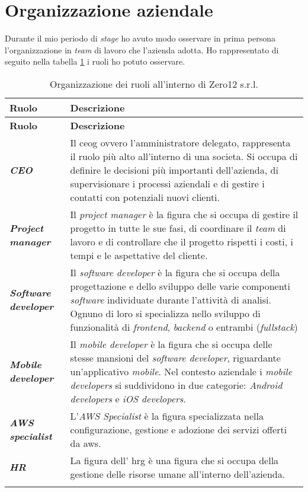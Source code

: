\section{Organizzazione aziendale}
Durante il mio periodo di \textit{stage} ho avuto modo osservare in prima persona l'organizzazione in \textit{team} di lavoro che l'azienda adotta.
Ho rappresentato di seguito nella tabella \ref{tab:ruoli} i ruoli ho potuto osservare.
\begin{longtable}{|p{3.5cm}|p{8cm}|}
    \hline
    \rowcolor{tableheader}\textbf{Ruolo} & \textbf{Descrizione} \\
    \hline
    \endfirsthead

    \rowcolor{tableheader}\textbf{Ruolo} & \textbf{Descrizione} \\
    \hline
    \endhead

    \hline
    \endfoot

    \hline
    \endlastfoot
    \hline
    \rowcolor{tableoddrow}\textbf{\textit{CEO}} & Il \gls{ceog} ovvero l'amministratore delegato, rappresenta il ruolo più alto all'interno di una societa. Si occupa di definire le decisioni più importanti dell'azienda, di supervisionare i processi aziendali e di gestire i contatti con potenziali nuovi clienti. \\
    \hline
    \rowcolor{tableevenrow}\textbf{\textit{Project manager}} & Il \textit{project manager} è la figura che si occupa di gestire il progetto in tutte le sue fasi, di coordinare il \textit{team} di lavoro e di controllare che il progetto rispetti i costi, i tempi e le aspettative del cliente.\\
    \hline
    \rowcolor{tableoddrow}\textbf{\textit{Software developer}} & Il \textit{software developer} è la figura che si occupa della progettazione e dello sviluppo delle varie componenti \textit{software} individuate durante l'attività di analisi. Ognuno di loro si specializza nello sviluppo di funzionalità di \textit{frontend}, \textit{backend} o entrambi (\textit{fullstack})\\
    \hline
    \rowcolor{tableevenrow}\textbf{\textit{Mobile developer}} & Il \textit{mobile developer} è la figura che si occupa delle stesse mansioni del \textit{software developer}, riguardante un'applicativo \textit{mobile}. Nel contesto aziendale i \textit{mobile developers} si suddividono in due categorie: \textit{Android developers} e \textit{iOS developers}.\\
    \hline
    \rowcolor{tableoddrow}\textbf{\textit{AWS specialist}} & L'\textit{AWS Specialist} è la figura specializzata nella configurazione, gestione e adozione dei servizi offerti da \gls{aws}.\\
    \hline
    \rowcolor{tableevenrow}\textbf{\textit{HR}} & La figura dell' \gls{hrg} è una figura che si occupa della gestione delle risorse umane all'interno dell'azienda.\\
    \hline
    \caption{Organizzazione dei ruoli all'interno di Zero12 s.r.l.}
    \label{tab:ruoli}
\end{longtable}

